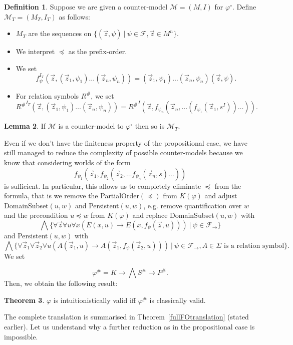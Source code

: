\documentclass[a4paper,11pt]{report}
\theoremstyle{definition}
\newtheorem{theorem}{Theorem}[section]
\theoremstyle{definition}
\theoremstyle{definition}
\newtheorem{lemma}[theorem]{Lemma}
\theoremstyle{definition}
\theoremstyle{definition}
\newtheorem{definition}[theorem]{Definition}
\theoremstyle{definition}
\theoremstyle{definition}
\begin{document}
	\begin{definition}
		Suppose we are given a counter-model $\mathcal M = (M, I)$ for $\varphi^\circ$. Define $\mathcal M_T = (M_T, I_T)$ as follows:
		\begin{itemize}
			\item $M_T$ are the sequences on $\{(\vec z, \psi)\:|\:\psi\in \mathcal F, \vec z\in M^n\}$.
			\item We interpret $\preceq$ as the prefix-order.
			\item We set $$f_\psi^{I_T}(\vec z, (\vec z_1, \psi_1)\dots (\vec z_n, \psi_n)) = (\vec z_1, \psi_1)\dots (\vec z_n, \psi_n)(\vec z, \psi).$$
			\item For relation symbols $R^\#$, we set $${R^\#}^{I_T}(\vec z, (\vec z_1, \psi_1)\dots (\vec z_n, \psi_n)) = {R^\#}^I(\vec z, f_{\psi_n}(\vec z_n, \dots(f_{\psi_1}(\vec z_1, s^I))\dots)).$$
		\end{itemize}
	\end{definition}
	
	\begin{lemma}
		If $\mathcal M$ is a counter-model to $\varphi^\circ$ then so is $\mathcal M_T$.
	\end{lemma}
	
	Even if we don't have the finiteness property of the propositional case, we have still managed to reduce the complexity of possible counter-models because we know that considering worlds of the form $$f_{\psi_1}(\vec z_1, f_{\psi_2}(\vec z_2, \dots f_{\psi_n}(\vec z_n, s)\dots))$$ is sufficient.
	In particular, this allows us to completely eliminate $\preceq$ from the formula, that is we remove the PartialOrder$(\preceq)$
	from $K(\varphi)$ and adjust DomainSubset$(u, w)$ and Persistent$(u, w)$, e.g. remove quantification over $w$ and the precondition $u\preceq w$ from $K(\varphi)$ and replace DomainSubset$(u, w)$ with
	$$\bigwedge\{\forall \vec z\forall u\forall x(E(x, u)\to E(x, f_\psi(\vec z, u)))\:|\:\psi\in\mathcal F_\to\}$$ and Persistent$(u, w)$ with $$\bigwedge\{\forall\vec z_1\forall\vec z_2\forall u(A(\vec z_1, u)\to A(\vec z_1, f_\psi(\vec z_2, u)))\:|\:\psi\in\mathcal F_\to, \text{$A\in\Sigma$ is a relation symbol}\}.$$ We set
	
	$$\varphi^{\#} = K\to \bigwedge S^\#\to P^\#.$$
	Then, we obtain the following result:
	\begin{theorem}
		\label{thm:fo-reduction}
		$\varphi$ is intuitionistically valid iff $\varphi^\#$ is classically valid.
	\end{theorem}
	The complete translation is summarised in Theorem~\ref{fullFOtranslation} (stated earlier). Let us understand why a further reduction as in the propositional case is impossible.
	
\end{document}
